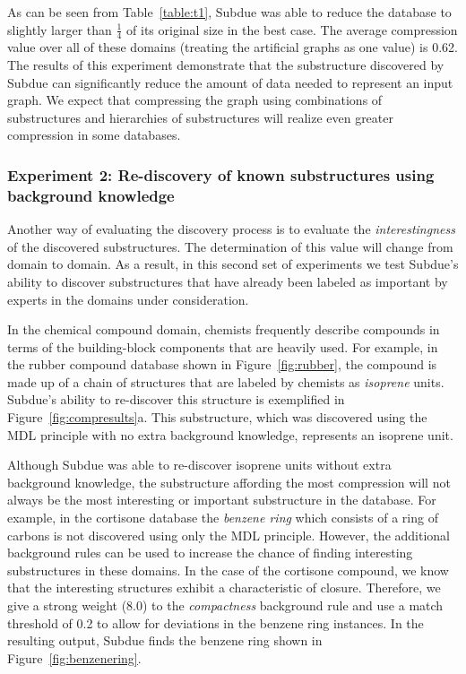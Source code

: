 
As can be seen from Table~\ref{table:t1}, {\sc Subdue} was able to reduce
the database to slightly larger than $\frac{1}{4}$ of its original size in the
best case.  The average compression value over all of these domains (treating
the artificial graphs as one value) is 0.62.  The results of this
experiment demonstrate that the substructure discovered by {\sc Subdue}
can significantly reduce
the amount of data needed to represent an input graph.  We expect
that compressing the graph using combinations of substructures and hierarchies
of substructures will realize even greater compression in some databases.

\subsubsection{Experiment 2:  Re-discovery of known substructures
using background knowledge}

Another way of evaluating the discovery process is to evaluate the
{\em interestingness} of the discovered substructures.  The determination
of this value will change from domain to domain.  As a result, in this
second set of experiments we test {\sc Subdue}'s ability to discover
substructures that have already been labeled as important by experts in
the domains under consideration.

In the chemical compound domain, chemists frequently describe compounds in
terms of the building-block components that are heavily used.  For example,
in the rubber compound database shown in Figure~\ref{fig:rubber}, the compound
is made up of a chain of structures that are labeled by chemists as
{\em isoprene} units.  {\sc Subdue}'s ability to re-discover this structure
is exemplified in Figure~\ref{fig:compresults}a.
This substructure, which was
discovered using the MDL principle with no extra background knowledge,
represents an isoprene unit.

Although {\sc Subdue} was able to re-discover isoprene units without
extra background knowledge, the substructure affording the most compression
will not always be the most interesting
or important substructure in the database.  For example, in the cortisone
database the {\em benzene ring} which consists of a ring of carbons is not
discovered using only the MDL principle.  However, the additional background
rules can be used to increase the chance of finding interesting substructures
in these domains.  In the case of the cortisone compound, we know that
the interesting structures exhibit a characteristic of closure.
Therefore, we give a strong weight (8.0) to the {\em compactness} background
rule and use a match threshold of 0.2 to allow for deviations in the benzene
ring instances.  In the resulting output, {\sc Subdue} finds the benzene
ring shown in Figure~\ref{fig:benzenering}.

